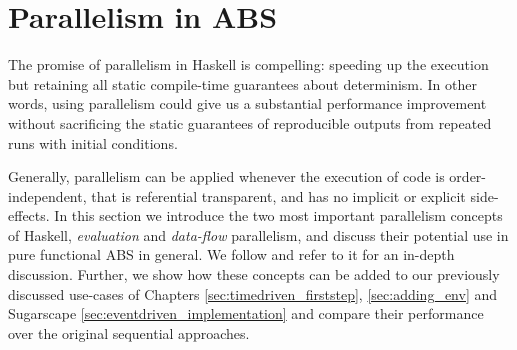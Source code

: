 \section{Parallelism in ABS}
The promise of parallelism in Haskell is compelling: speeding up the execution but retaining all static compile-time guarantees about determinism. In other words, using parallelism could give us a substantial performance improvement without sacrificing the static guarantees of reproducible outputs from repeated runs with initial conditions.

Generally, parallelism can be applied whenever the execution of code is order-independent, that is referential transparent, and has no implicit or explicit side-effects. In this section we introduce the two most important parallelism concepts of Haskell, \textit{evaluation} and \textit{data-flow} parallelism, and discuss their potential use in pure functional ABS in general. We follow \cite{marlow_parallel_2013} and refer to it for an in-depth discussion. Further, we show how these concepts can be added to our previously discussed use-cases of Chapters \ref{sec:timedriven_firststep}, \ref{sec:adding_env} and Sugarscape \ref{sec:eventdriven_implementation} and compare their performance over the original sequential approaches.





%
%




